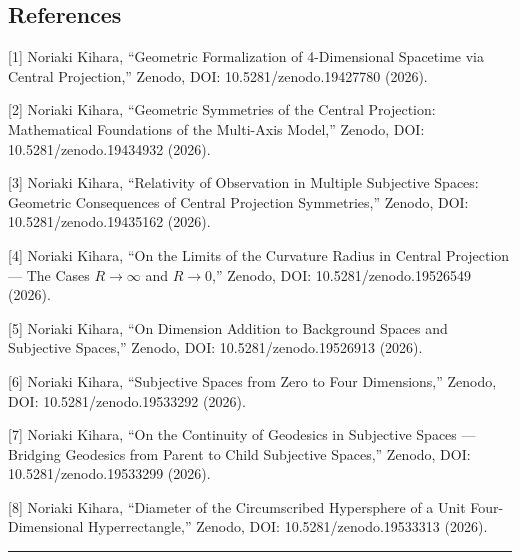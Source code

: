 \documentclass[a4paper,11pt]{article}
\theoremstyle{definition}
\begin{document}
\subsection{References}\label{references}

{[}1{]} Noriaki Kihara, ``Geometric Formalization of 4-Dimensional
Spacetime via Central Projection,'' Zenodo, DOI: 10.5281/zenodo.19427780
(2026).

{[}2{]} Noriaki Kihara, ``Geometric Symmetries of the Central
Projection: Mathematical Foundations of the Multi-Axis Model,'' Zenodo,
DOI: 10.5281/zenodo.19434932 (2026).

{[}3{]} Noriaki Kihara, ``Relativity of Observation in Multiple
Subjective Spaces: Geometric Consequences of Central Projection
Symmetries,'' Zenodo, DOI: 10.5281/zenodo.19435162 (2026).

{[}4{]} Noriaki Kihara, ``On the Limits of the Curvature Radius in
Central Projection --- The Cases \(R \to \infty\) and \(R \to 0\),''
Zenodo, DOI: 10.5281/zenodo.19526549 (2026).

{[}5{]} Noriaki Kihara, ``On Dimension Addition to Background Spaces and
Subjective Spaces,'' Zenodo, DOI: 10.5281/zenodo.19526913 (2026).

{[}6{]} Noriaki Kihara, ``Subjective Spaces from Zero to Four
Dimensions,'' Zenodo, DOI: 10.5281/zenodo.19533292 (2026).

{[}7{]} Noriaki Kihara, ``On the Continuity of Geodesics in Subjective
Spaces --- Bridging Geodesics from Parent to Child Subjective Spaces,''
Zenodo, DOI: 10.5281/zenodo.19533299 (2026).

{[}8{]} Noriaki Kihara, ``Diameter of the Circumscribed Hypersphere of a
Unit Four-Dimensional Hyperrectangle,'' Zenodo, DOI:
10.5281/zenodo.19533313 (2026).

\begin{center}\rule{0.5\linewidth}{0.5pt}\end{center}
\end{document}
